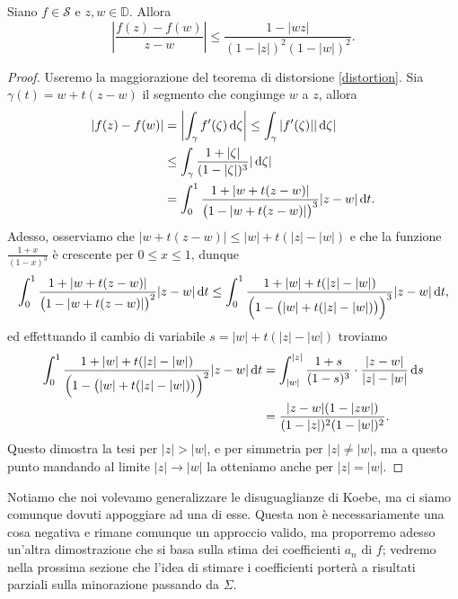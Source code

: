 \begin{thm}
  Siano $f \in \mathcal{S}$ e $z,w \in \mathbb{D}$. Allora
  \begin{equation}\label{maggiorazione}
    \left|\frac{f(z)-f(w)}{z-w}\right| \le \frac{1-|wz|}{(1-|z|)^2(1-|w|)^2}.
  \end{equation}
\end{thm}

\begin{proof}
  Useremo la maggiorazione del teorema di distorsione \eqref{distortion}. Sia $\gamma(t)=w+t(z-w)$ il segmento che congiunge $w$ a $z$, allora
  \begin{align*}
    |f(z)-f(w)|&=\left|\int_{\gamma}f'(\zeta)\mathop{}\!\mathrm{d}\zeta\right| \le \int_{\gamma} |f'(\zeta)||\mathop{}\!\mathrm{d}\zeta| \\
    & \le \int_{\gamma} \frac{1+|\zeta|}{(1-|\zeta|)^3}|\mathop{}\!\mathrm{d}\zeta| \\
    &=\int_0^1 \frac{1+|w+t(z-w)|}{\big(1-|w+t(z-w)|\big)^3}|z-w|\mathop{}\!\mathrm{d} t.
  \end{align*}
  Adesso, osserviamo che $|w+t(z-w)| \le |w|+t(|z|-|w|)$ e che la funzione $\frac{1+x}{(1-x)^3}$ è crescente per $0 \le x \le 1$, dunque
  \begin{gather*}
    \int_0^1 \frac{1+|w+t(z-w)|}{\big(1-|w+t(z-w)|\big)^2}|z-w|\mathop{}\!\mathrm{d} t \le \int_0^1 \frac{1+|w|+t(|z|-|w|)}{\Big(1-\big(|w|+t(|z|-|w|)\big)\Big)^3}|z-w|\mathop{}\!\mathrm{d} t,
  \end{gather*}
  ed effettuando il cambio di variabile $s=|w|+t(|z|-|w|)$ troviamo
  \begin{align*}
    \int_0^1 \frac{1+|w|+t(|z|-|w|)}{\Big(1-\big(|w|+t(|z|-|w|)\big)\Big)^2}|z-w|\mathop{}\!\mathrm{d} t &=\int_{|w|}^{|z|} \frac{1+s}{(1-s)^3}\cdot\frac{|z-w|}{|z|-|w|}\mathop{}\!\mathrm{d} s\\
    &=\frac{|z-w|(1-|zw|)}{(1-|z|)^2(1-|w|)^2}.
  \end{align*}
  Questo dimostra la tesi per $|z|>|w|$, e per simmetria per $|z|\not=|w|$, ma a questo punto mandando al limite $|z| \longrightarrow |w|$ la otteniamo anche per $|z|=|w|$.
\end{proof}

Notiamo che noi volevamo generalizzare le disuguaglianze di Koebe, ma ci siamo comunque dovuti appoggiare ad una di esse. Questa non è necessariamente una cosa negativa e rimane comunque un approccio valido, ma proporremo adesso un'altra dimostrazione che si basa sulla stima dei coefficienti $a_n$ di $f$; vedremo nella prossima sezione che l'idea di stimare i coefficienti porterà a risultati parziali sulla minorazione passando da $\Sigma$.

